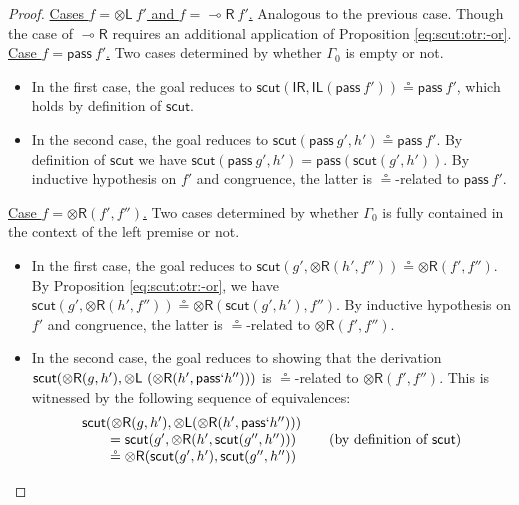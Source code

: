 \documentclass[sn-mathphys-num]{sn-jnl}%
\newcommand{\GG}{\Gamma}
\newcommand{\vd}{\vdash}
\newcommand{\tl}{\otimes \mathsf{L}}
\newcommand{\tr}{\otimes\mathsf{R}}
\newcommand{\pass}{\mathsf{pass}}
\newcommand{\unitl}{\mathsf{IL}}
\newcommand{\unitr}{\mathsf{IR}}
\newcommand{\lolli}{\multimap}
\newcommand{\lright}{{\lolli}\mathsf{R}}
\newcommand{\mf}[1]{\mathsf{#1}}
\newcommand{\scut}[2]{\mf{scut} (#1 , #2)}
\theoremstyle{thmstyleone}%
\theoremstyle{thmstyletwo}%
\theoremstyle{thmstylethree}%
\begin{document}
\begin{proof}
  \underline{Cases $f = \tl \ f'$ and $f = \lright \ f'$.} Analogous to the previous case.
  Though the case of $\lright$ requires an additional application of Proposition \ref{eq:scut:otr:-or}.
  \\
  \underline{Case $f = \pass \ f'$.} Two cases determined by whether $\GG_0$ is empty or not.
  \begin{itemize}
    \item In the first case, the goal reduces to $\scut{\unitr}{\unitl (\pass \ f')} \circeq \pass \ f'$, which holds by definition of $\mf{scut}$.
    \item In the second case, the goal reduces to $\scut{\pass \ g'}{h'} \circeq \pass\ f'$. By definition of $\mf{scut}$ we have
$\scut{\pass \ g'}{h'} = \pass (\scut{g'}{h'})$. By inductive hypothesis on $f'$ and congruence, the latter is $\circeq$-related to $\pass\ f'$.
  \end{itemize} 
  \underline{Case $f = \tr (f',f'')$.} Two cases determined by whether $\GG_0$ is fully contained in the context of the left premise or not.
  \begin{itemize}
    \item In the first case, the goal reduces to $\scut{g'}{\tr (h', f'')} \circeq \tr (f' , f'')$. By Proposition \ref{eq:scut:otr:-or}, we have $\scut{g'}{\tr (h', f'')} \circeq \tr (\scut{g'}{h'} , f'')$. By inductive hypothesis on $f'$ and congruence, the latter is $\circeq$-related to $\tr (f' , f'')$.
    \item In the second case, the goal reduces to showing that the derivation $\mf{scut}(\tr (g,h'),\tl\ (\tr (h',\pass` h'')))$ is $\circeq$-related to $\tr (f',f'')$.
      This is witnessed by the following sequence of equivalences:
  \[\arraycolsep=10pt    
      \begin{array}{lr}
        \mf{scut}(\tr (g,h'),\tl (\tr (h',\pass` h''))) \\
        \qquad = \mf{scut}(g',\tr (h',\mf{scut}(g'',h'')))
        & \text{(by definition of $\mf{scut}$)} \\
        \qquad \circeq \tr (\mf{scut}(g',h'),\mf{scut}(g'',h''))

\end{array}\]
\end{itemize}
\end{proof}
\end{document}
